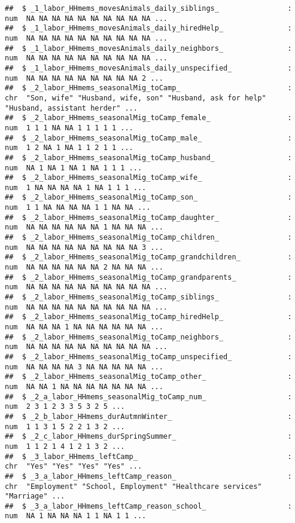 \documentclass[
]{article}
\begin{document}
\begin{verbatim}
##  $ _1_labor_HHmems_movesAnimals_daily_siblings_                : num  NA NA NA NA NA NA NA NA NA NA ...
##  $ _1_labor_HHmems_movesAnimals_daily_hiredHelp_               : num  NA NA NA NA NA NA NA NA NA NA ...
##  $ _1_labor_HHmems_movesAnimals_daily_neighbors_               : num  NA NA NA NA NA NA NA NA NA NA ...
##  $ _1_labor_HHmems_movesAnimals_daily_unspecified_             : num  NA NA NA NA NA NA NA NA NA 2 ...
##  $ _2_labor_HHmems_seasonalMig_toCamp_                         : chr  "Son, wife" "Husband, wife, son" "Husband, ask for help" "Husband, assistant herder" ...
##  $ _2_labor_HHmems_seasonalMig_toCamp_female_                  : num  1 1 1 NA NA 1 1 1 1 1 ...
##  $ _2_labor_HHmems_seasonalMig_toCamp_male_                    : num  1 2 NA 1 NA 1 1 2 1 1 ...
##  $ _2_labor_HHmems_seasonalMig_toCamp_husband_                 : num  NA 1 NA 1 NA 1 NA 1 1 1 ...
##  $ _2_labor_HHmems_seasonalMig_toCamp_wife_                    : num  1 NA NA NA NA 1 NA 1 1 1 ...
##  $ _2_labor_HHmems_seasonalMig_toCamp_son_                     : num  1 1 NA NA NA NA 1 1 NA NA ...
##  $ _2_labor_HHmems_seasonalMig_toCamp_daughter_                : num  NA NA NA NA NA NA 1 NA NA NA ...
##  $ _2_labor_HHmems_seasonalMig_toCamp_children_                : num  NA NA NA NA NA NA NA NA NA 3 ...
##  $ _2_labor_HHmems_seasonalMig_toCamp_grandchildren_           : num  NA NA NA NA NA NA 2 NA NA NA ...
##  $ _2_labor_HHmems_seasonalMig_toCamp_grandparents_            : num  NA NA NA NA NA NA NA NA NA NA ...
##  $ _2_labor_HHmems_seasonalMig_toCamp_siblings_                : num  NA NA NA NA NA NA NA NA NA NA ...
##  $ _2_labor_HHmems_seasonalMig_toCamp_hiredHelp_               : num  NA NA NA 1 NA NA NA NA NA NA ...
##  $ _2_labor_HHmems_seasonalMig_toCamp_neighbors_               : num  NA NA NA NA NA NA NA NA NA NA ...
##  $ _2_labor_HHmems_seasonalMig_toCamp_unspecified_             : num  NA NA NA NA 3 NA NA NA NA NA ...
##  $ _2_labor_HHmems_seasonalMig_toCamp_other_                   : num  NA NA 1 NA NA NA NA NA NA NA ...
##  $ _2_a_labor_HHmems_seasonalMig_toCamp_num_                   : num  2 3 1 2 3 3 5 3 2 5 ...
##  $ _2_b_labor_HHmems_durAutmnWinter_                           : num  1 1 3 1 5 2 2 1 3 2 ...
##  $ _2_c_labor_HHmems_durSpringSummer_                          : num  1 1 2 1 4 1 2 1 3 2 ...
##  $ _3_labor_HHmems_leftCamp_                                   : chr  "Yes" "Yes" "Yes" "Yes" ...
##  $ _3_a_labor_HHmems_leftCamp_reason_                          : chr  "Employment" "School, Employment" "Healthcare services" "Marriage" ...
##  $ _3_a_labor_HHmems_leftCamp_reason_school_                   : num  NA 1 NA NA NA 1 1 NA 1 1 ...

\end{verbatim}
\end{document}
